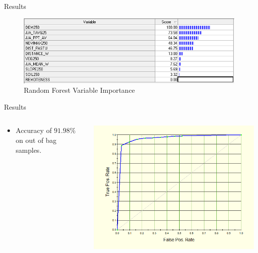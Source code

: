 \documentclass[10pt]{beamer}
\begin{document}
\begin{frame}{Results}
    \begin{figure}
    \begin{center}
    \includegraphics[width = .9\textwidth]{RandomForestVariableImportance.png}
    \caption{Random Forest Variable Importance}
\end{center}
\end{figure}
\end{frame}


\begin{frame}{Results}
\begin{columns}[T]
    \begin{column}{.35 \textwidth}
        \begin{itemize}
            \item Accuracy of $91.98\%$ on out of bag samples. 
        \end{itemize}
    \end{column}
    
    \begin{column}{.65\textwidth}
    \begin{center}
        \includegraphics[width = \textwidth]{ROCcurveOOB.png}
    \end{center}
    \end{column}
\end{columns}
\end{frame}
\end{document}
